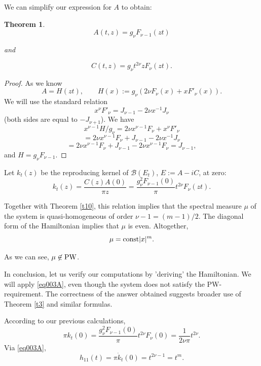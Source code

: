 \documentclass[11pt,twoside,reqno]{amsart}
\def\const{\text{\rm const}}
\def\PW{\text{\rm PW}}
\def\ms{\bigskip}
\def\ms{\medskip}
\def\no{\noindent}
\def\BB{{\mathcal B}}
\def\const{\text{\rm const}}
\theoremstyle{plain}
\newtheorem{theorem}{Theorem}
\numberwithin{equation}{section}
\begin{document}
 
 \ms\no We can simplify our expression for $A$ to obtain:
 
 \begin{theorem} $$A(t,z)=g_\nu F_{\nu-1}(zt)$$
 	
 	and
 	
 	$$C(t,z)=g_\nu t^{2\nu}z F_\nu(zt).$$
 \end{theorem}
 
 \begin{proof}  As we know
 $$A=H(zt),\qquad H(x):= g_\nu(2\nu F_\nu(x)+xF'_\nu(x)).$$
 We will use the standard relation $$x^\nu F'_\nu=J_{\nu-1}-2\nu x^{-1}J_\nu$$
 (both sides are equal to $-J_{\nu+1}$). We have
 $$x^{\nu-1}H/g_\nu =2\nu x^{\nu-1}F_\nu+x^\nu F'_\nu$$$$=2\nu x^{\nu-1}F_\nu+J_{\nu-1}-2\nu x^{-1}J_\nu
 $$$$=2\nu x^{\nu-1}F_\nu+J_{\nu-1}-2\nu x^{\nu-1}F_\nu =J_{\nu-1},$$
 and $H=g_\nu F_{\nu-1}$.
 \end{proof} 
 
 \ms\no Let $k_t(z)$ be the reproducing kernel of $\BB(E_t)$, $E:=A-iC$, at zero:
 $$k_t(z)=\frac{C(z)A(0)}{\pi z}=\frac{g_\nu^2 F_{\nu-1}(0)}\pi t^{2\nu} F_\nu(zt).$$
 
 Together with Theorem \ref{t10}, this relation implies that the spectral measure $\mu$ of the system is quasi-homogeneous of order $\nu-1=(m-1)/2$. The diagonal form of the Hamiltonian implies that $\mu$ is even. Altogether, 
 $$\mu=\const |x|^{m}.$$
 
 As we can see, $\mu\not\in \PW$.
 
 \ms\no In conclusion, let us verify our computations by 'deriving' the Hamiltonian. We will apply \eqref{eq003A}, even though
 the system does not satisfy the PW-requirement. The correctness of the  answer obtained  suggests broader use of Theorem \ref{t3} and similar formulas.
 
 According to our previous calculations,
 $$\pi k_t(0)=\frac{g_\nu^2 F_{\nu-1}(0)}\pi t^{2\nu} F_\nu(0)= \frac{1}{2\nu\pi} t^{2\nu}.$$ 
 Via \eqref{eq003A},
 $$h_{11}(t)=\pi\dot k_t(0)=t^{2\nu-1}=t^m.$$
 
\end{document}
